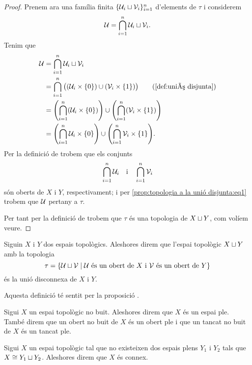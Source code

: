 \documentclass[../Apunts.tex]{subfiles}
\begin{document}
\begin{proposition}
\begin{proof}
			Prenem ara una família finita \(\{\mathcal{U}_{i}\sqcup\mathcal{V}_{i}\}_{i=1}^{n}\) d'elements de \(\tau\) i considerem
			\[\mathcal{U}=\bigcap_{i=1}^{n}\mathcal{U}_{i}\sqcup\mathcal{V}_{i}.\]
			Tenim que
			\begin{align*}
				\obert{U}&=\bigcap_{i=1}^{n}\obert{U}_{i}\uniodisjunta\obert{V}_{i} \\
				&=\bigcap_{i=1}^{n}\big((\obert{U}_{i}\times\{0\})\cup(\obert{V}_{i}\times\{1\})\big) \tag{\ref{def:unió disjunta}} \\
				&=\left(\bigcap_{i=1}^{n}(\obert{U}_{i}\times\{0\})\right)\cup\left(\bigcap_{i=1}^{n}(\obert{V}_{i}\times\{1\})\right) \\
				&=\left(\bigcap_{i=1}^{n}\obert{U}_{i}\times\{0\}\right)\cup\left(\bigcap_{i=1}^{n}\obert{V}_{i}\times\{1\}\right).
			\end{align*}
			Per la definició de  trobem que els conjunts
			\[\bigcap_{i=1}^{n}\mathcal{U}_{i}\quad\text{i}\quad\bigcap_{i=1}^{n}\mathcal{V}_{i}\]
			són oberts de \(X\) i \(Y\), respectivament; i per \eqref{prop:topologia a la unió disjunta:eq1} trobem que \(\mathcal{U}\) pertany a \(\tau\).
			
			Per tant per la definició de  trobem que \(\tau\) és una topologia de \(X\sqcup Y\), com volíem veure.
		\end{proof}
	\end{proposition}
	\begin{definition}
		\label{def:unió disconnexa}
		Siguin \(X\) i \(Y\) dos espais topològics. Aleshores direm que l'espai topològic \(X\sqcup Y\) amb la topologia
		\[\tau=\{\mathcal{U}\sqcup\mathcal{V}\mid\mathcal{U}\text{ és un obert de }X\text{ i }\mathcal{V}\text{ és un obert de }Y\}\]
		és la unió disconnexa de \(X\) i \(Y\).
		
		Aquesta definició té sentit per la proposició .
	\end{definition}
	\begin{definition}
		\label{def:espai ple}
		\label{def:obert ple}
		\label{def:tancat ple}
		Sigui \(X\) un espai topològic no buit. Aleshores direm que \(X\) és un espai ple. També direm que un obert no buit de \(X\) és un obert ple i que un tancat no buit de \(X\) és un tancat ple.
	\end{definition}
	\begin{definition}
		\label{def:espai connex}
		Sigui \(X\) un espai topològic tal que no existeixen dos espais plens \(Y_{1}\) i \(Y_{2}\) tals que \(X\cong Y_{1}\sqcup Y_{2}\). Aleshores direm que \(X\) és connex.
	\end{definition}
\end{document}

